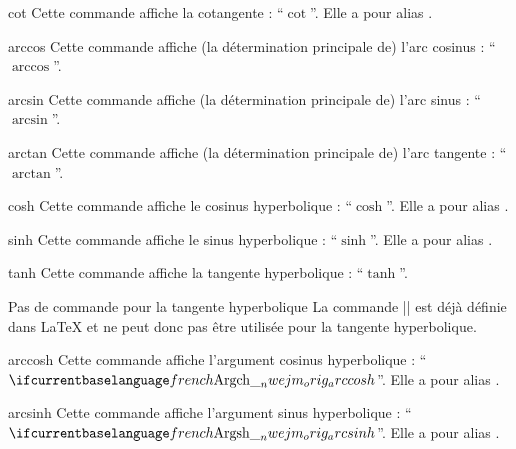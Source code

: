 \documentclass[french,nolocaltoc]{nwejmart}
\newtheorem[style=definition]{fait}
\newtheorem[title=expérience]{experience}
\newtheorem[title-plural=anneaux]{anneau}
\newtheorem[title=idéal,title-plural=idéaux]{ideal}
\begin{document}
\begin{docCommand}{cot}{}
  Cette commande affiche la cotangente : \enquote{$\cot$}. Elle a pour alias
  .
\end{docCommand}

\begin{docCommand}{arccos}{}
  Cette commande affiche (la détermination principale de) l'arc cosinus :
  \enquote{$\arccos$}.
\end{docCommand}

\begin{docCommand}{arcsin}{}
  Cette commande affiche (la détermination principale de) l'arc sinus :
  \enquote{$\arcsin$}.
\end{docCommand}

\begin{docCommand}{arctan}{}
  Cette commande affiche (la détermination principale de) l'arc tangente :
  \enquote{$\arctan$}.
\end{docCommand}

\begin{docCommand}{cosh}{}
  Cette commande affiche le cosinus hyperbolique : \enquote{$\cosh$}. Elle a pour
  alias .
\end{docCommand}

\begin{docCommand}{sinh}{}
  Cette commande affiche le sinus hyperbolique : \enquote{$\sinh$}. Elle a pour
  alias .
\end{docCommand}

\begin{docCommand}{tanh}{}
  Cette commande affiche la tangente hyperbolique : \enquote{$\tanh$}.
  \begin{dbremark}{Pas de commande \protect{} pour la tangente hyperbolique}{}
    La commande |\th| est déjà définie dans \LaTeX{} et ne peut donc pas être
    utilisée pour la tangente hyperbolique.
  \end{dbremark}
\end{docCommand}

\begin{docCommand}{arccosh}{}
  Cette commande affiche l'argument cosinus hyperbolique :
  \enquote{$\arccosh$}. Elle a pour alias .
\end{docCommand}

\begin{docCommand}{arcsinh}{}
  Cette commande affiche l'argument sinus hyperbolique :
  \enquote{$\arcsinh$}. Elle a pour alias .
\end{docCommand}
\end{document}
